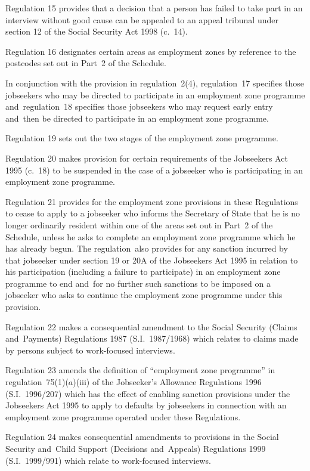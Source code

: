 \documentclass[12pt,a4paper]{article}
\begin{document}
Regulation 15 provides that a decision that a person has failed to take part in an interview without good cause can be appealed to an appeal tribunal under section 12 of the Social Security Act 1998 (c.~14).

Regulation 16 designates certain areas as employment zones by reference to the postcodes set out in Part~2 of the Schedule.

In conjunction with the provision in regulation~2(4), regulation~17 specifies those jobseekers who may be directed to participate in an employment zone programme and~regulation~18 specifies those jobseekers who may request early entry and~then be directed to participate in an employment zone programme.

Regulation 19 sets out the two stages of the employment zone programme.

Regulation 20 makes provision for certain requirements of the Jobseekers Act 1995 (c.~18) to be suspended in the case of a jobseeker who is participating in an employment zone programme.

Regulation 21 provides for the employment zone provisions in these Regulations to cease to apply to a jobseeker who informs the Secretary of State that he is no longer ordinarily resident within one of the areas set out in Part~2 of the Schedule, unless he asks to complete an employment zone programme which he has already begun. The regulation~also provides for any sanction incurred by that jobseeker under section 19 or 20A of the Jobseekers Act 1995 in relation to his participation (including a failure to participate) in an employment zone programme to end and~for no further such sanctions to be imposed on a jobseeker who asks to continue the employment zone programme under this provision.

Regulation 22 makes a consequential amendment to the Social Security (Claims and~Payments) Regulations 1987 (S.I.~1987/1968) which relates to claims made by persons subject to work-focused interviews.

Regulation 23 amends the definition of “employment zone programme” in regulation~75(1)($a$)(iii)  of the Jobseeker’s Allowance Regulations 1996 (S.I.~1996/207) which has the effect of enabling sanction provisions under the Jobseekers Act 1995 to apply to defaults by jobseekers in connection with an employment zone programme operated under these Regulations.

Regulation 24 makes consequential amendments to provisions in the Social Security and~Child Support (Decisions and~Appeals) Regulations 1999 (S.I.~1999/991) which relate to work-focused interviews.
\end{document}
